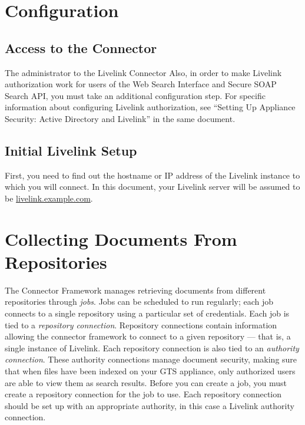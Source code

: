 \begin{changemargin}{1.5in}{0in}
\section{Configuration}

\subsection{Access to the Connector}

The administrator to the Livelink Connector  
Also, in order to make
Livelink authorization work for users of the Web Search Interface and
Secure SOAP Search API, you must take an additional configuration step.
For specific information about configuring Livelink authorization,
see ``Setting Up Appliance Security: Active Directory and Livelink''
in the same document.

\subsection{Initial Livelink Setup}

First, you need to find out the hostname or IP address of the Livelink
instance to which you will connect. In this document, your Livelink server
will be assumed to be \url{livelink.example.com}.



\section{Collecting Documents From Repositories} %

The Connector Framework manages retrieving documents from different
repositories through \emph{jobs}. Jobs can be scheduled to run
regularly; each job connects to a single repository using a particular
set of credentials. Each job is tied to a \emph{repository
connection}. Repository connections contain information allowing the
connector framework to connect to a given repository --- that is, a
single instance of Livelink. Each repository connection is also tied
to an \emph{authority connection}. These authority connections manage
document security, making sure that when files have been indexed on
your GTS appliance, only authorized users are able to view them as
search results. Before you can create a job, you must create a
repository connection for the job to use. Each repository connection
should be set up with an appropriate authority, in this case a
Livelink authority connection.


\end{changemargin}
